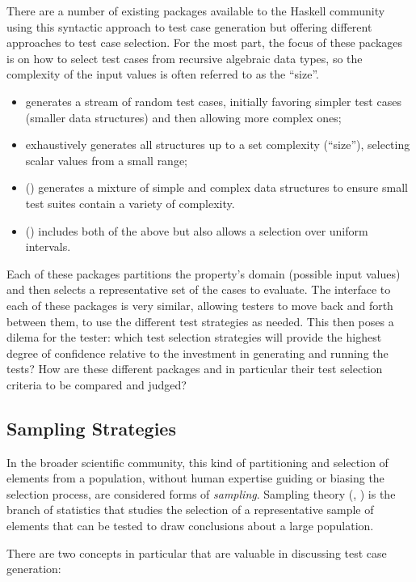 There are a number of existing \pbt packages available to the Haskell community
using this syntactic approach to test case generation but 
offering different approaches to test case selection.
For the most part, the focus of these packages is on how to select test cases
from recursive algebraic data types,
so the complexity of the input values is often referred to as the ``size''.
\begin{itemize}
\item \QC generates a stream of random test cases,
initially favoring simpler test cases (smaller data structures) and then allowing more complex ones;
\item \SC exhaustively generates all structures up to a set complexity (``size''),
selecting scalar values from a small range;
\item \EC (\cite{EasyCheck2008}) generates a mixture of
simple and complex data structures to ensure small test suites contain a variety of complexity.
\item \FEAT(\cite{Duregard2012}) includes both of the above but
also allows a selection over uniform intervals.
\end{itemize}
\noindent
Each of these packages partitions the property's domain (possible input values)
and then selects a representative set of the cases to evaluate.
The interface to each of these packages is very similar,
allowing testers to move back and forth between them,
to use the different test strategies as needed.
This then poses a dilema for the tester:
which test selection strategies will provide
the highest degree of confidence
relative to the investment in generating and running the tests?
How are these different packages and in particular their test selection criteria 
to be compared and judged?

\subsection{Sampling Strategies}
In the broader scientific community,
this kind of partitioning and selection of elements from a population,
without human expertise guiding or biasing the selection process,
are considered forms of \emph{sampling}.
Sampling theory (\cite{Stuart1968}, \cite{Cochran1977}) is 
the branch of statistics that studies
the selection of a representative sample of elements 
that can be tested to draw conclusions about a large population.

There are two concepts in particular that are valuable in discussing test case generation:

